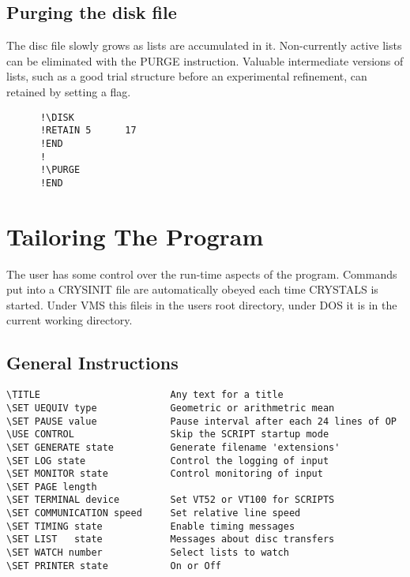 \documentclass[10pt,a4paper]{report}
\begin{document}
\section{Purging the disk file}



The disc file slowly grows as lists are accumulated in it.
 Non-currently
 active lists can be eliminated with the PURGE instruction. Valuable
 intermediate versions of lists, such as a good trial structure before an
 experimental refinement, can retained by setting a flag.


\small\begin{verbatim}
      !\DISK
      !RETAIN 5      17
      !END
      !
      !\PURGE
      !END
\end{verbatim}\normalsize






\chapter{Tailoring The Program}


The user has some control over the run-time aspects of the program.  Commands put into a CRYSINIT file are automatically obeyed each time CRYSTALS is started. Under VMS this fileis in the users root directory, under DOS it is in the current working directory.

\section{General Instructions}

\small\begin{verbatim}
\TITLE                       Any text for a title
\SET UEQUIV type             Geometric or arithmetric mean
\SET PAUSE value             Pause interval after each 24 lines of OP
\USE CONTROL                 Skip the SCRIPT startup mode
\SET GENERATE state          Generate filename 'extensions'
\SET LOG state               Control the logging of input
\SET MONITOR state           Control monitoring of input
\SET PAGE length
\SET TERMINAL device         Set VT52 or VT100 for SCRIPTS
\SET COMMUNICATION speed     Set relative line speed
\SET TIMING state            Enable timing messages
\SET LIST   state            Messages about disc transfers
\SET WATCH number            Select lists to watch
\SET PRINTER state           On or Off
\end{verbatim}\normalsize
\end{document}
